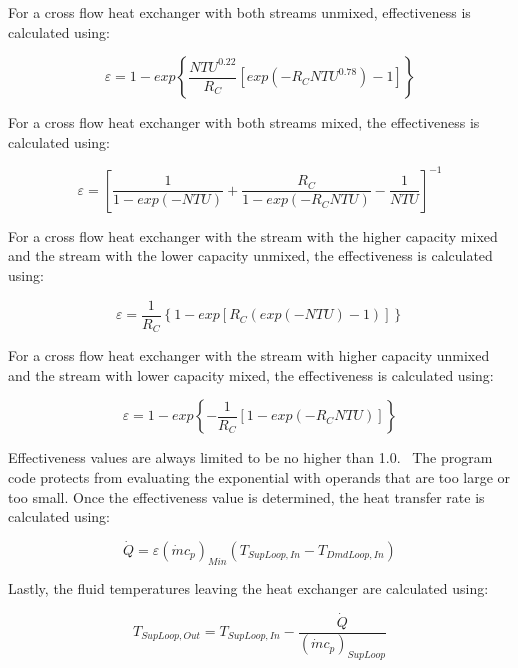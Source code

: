For a cross flow heat exchanger with both streams unmixed, effectiveness is calculated using:

\begin{equation}
\varepsilon  = 1 - exp\left\{ {\frac{{NT{U^{0.22}}}}{{{R_C}}}\left[ {exp\left( { - {R_C}NT{U^{0.78}}} \right) - 1} \right]} \right\}
\end{equation}

For a cross flow heat exchanger with both streams mixed, the effectiveness is calculated using:

\begin{equation}
\varepsilon  = {\left[ {\frac{1}{{1 - exp\left( { - NTU} \right)}} + \frac{{{R_C}}}{{1 - exp\left( { - {R_C}NTU} \right)}} - \frac{1}{{NTU}}} \right]^{ - 1}}
\end{equation}

For a cross flow heat exchanger with the stream with the higher capacity mixed and the stream with the lower capacity unmixed, the effectiveness is calculated using:

\begin{equation}
\varepsilon  = \frac{1}{{{R_C}}}\left\{ {1 - exp\left[ {{R_C}\left( {exp\left( { - NTU} \right) - 1} \right)} \right]} \right\}
\end{equation}

For a cross flow heat exchanger with the stream with higher capacity unmixed and the stream with lower capacity mixed, the effectiveness is calculated using:

\begin{equation}
\varepsilon  = 1 - exp\left\{ { - \frac{1}{{{R_C}}}\left[ {1 - exp\left( { - {R_C}NTU} \right)} \right]} \right\}
\end{equation}

Effectiveness values are always limited to be no higher than 1.0.~ The program code protects from evaluating the exponential with operands that are too large or too small. Once the effectiveness value is determined, the heat transfer rate is calculated using:

\begin{equation}
\dot Q = \varepsilon {\left( {\dot m{c_p}} \right)_{Min}}\left( {{T_{SupLoop,In}} - {T_{DmdLoop,In}}} \right)
\end{equation}

Lastly, the fluid temperatures leaving the heat exchanger are calculated using:

\begin{equation}
{T_{SupLoop,Out}} = {T_{SupLoop,In}} - \frac{{\dot Q}}{{{{\left( {\dot m{c_p}} \right)}_{SupLoop}}}}
\end{equation}

